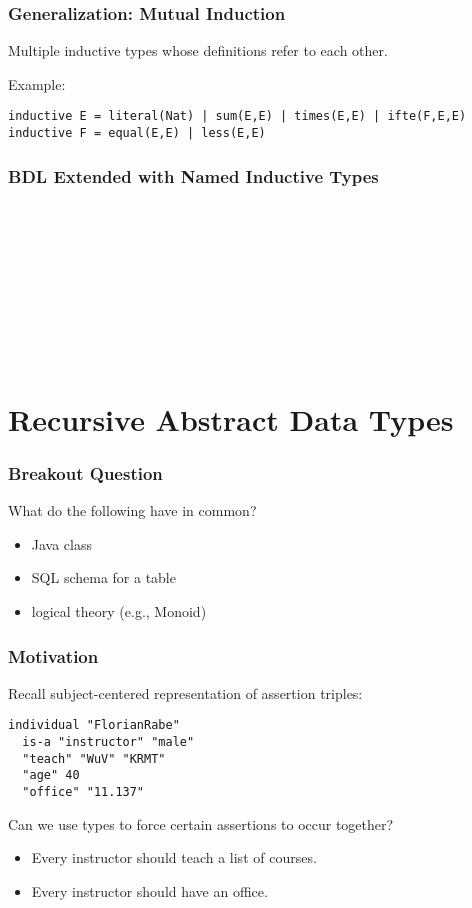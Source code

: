 \begin{frame}[fragile]\frametitle{Generalization: Mutual Induction}
Multiple inductive types whose definitions refer to each other.

Example:
\begin{lstlisting}
inductive E = literal(Nat) | sum(E,E) | times(E,E) | ifte(F,E,E)
inductive F = equal(E,E) | less(E,E)
\end{lstlisting}
\end{frame}

\begin{frame}\frametitle{BDL Extended with Named Inductive Types}\label{def:bdl+cdt}
\begin{commgrammar}
\\
\\
\\
\\
\\
\\
\\
\\
\end{commgrammar}
\end{frame}

\section{Recursive Abstract Data Types}

\begin{frame}\frametitle{Breakout Question}
What do the following have in common?
\begin{itemize}
\item Java class
\item SQL schema for a table
\item logical theory (e.g., Monoid)
\end{itemize}
\end{frame}

\begin{frame}[fragile]\frametitle{Motivation}
Recall subject-centered representation of assertion triples:

\begin{lstlisting}
individual "FlorianRabe"
  is-a "instructor" "male"
  "teach" "WuV" "KRMT"
  "age" 40
  "office" "11.137"
\end{lstlisting}

Can we use types to force certain assertions to occur together?
\begin{itemize}
\item Every instructor should teach a list of courses.
\item Every instructor should have an office.
\end{itemize}
\end{frame}

